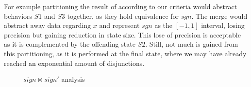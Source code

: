 For example partitioning the result of  according to our criteria would abstract behaviors $S1$ and $S3$ together, as they hold equivalence for $sgn$. The merge would abstract away data regarding $x$ and represent $sgn$ as the $[-1,1]$ interval, losing precision but gaining reduction in state size. This lose of precision is acceptable as it is complemented by the offending state $S2$. Still, not much is gained from this partitioning, as it is performed at the final state, where we may have already reached an exponential amount of disjunctions.
\begin{figure}
\caption{$sign \bowtie sign'$ analysis}
\end{figure}
